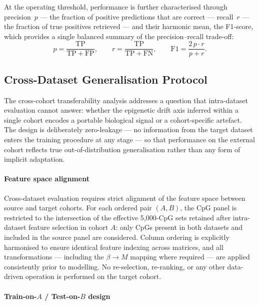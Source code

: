 \noindent At the operating threshold, performance is further characterised through
precision~$p$ — the fraction of positive predictions that are correct —
recall~$r$ — the fraction of true positives retrieved — and their harmonic
mean, the F1-score, which provides a single balanced summary of the
precision--recall trade-off:
\begin{equation}
p = \frac{\mathrm{TP}}{\mathrm{TP}+\mathrm{FP}},
\qquad
r = \frac{\mathrm{TP}}{\mathrm{TP}+\mathrm{FN}},
\qquad
\mathrm{F1} = \frac{2\,p\cdot r}{p+r}.
\end{equation}

\subsection{Cross-Dataset Generalisation Protocol}
\label{sec:cross_dataset}

The cross-cohort transferability analysis addresses a question
that intra-dataset evaluation cannot answer: whether the
epigenetic drift axis inferred within a single cohort encodes
a portable biological signal or a cohort-specific artefact.
The design is deliberately zero-leakage — no information from
the target dataset enters the training procedure at any stage
— so that performance on the external cohort reflects true
out-of-distribution generalisation rather than any form of
implicit adaptation.

\paragraph{Feature space alignment}

Cross-dataset evaluation requires strict alignment of the
feature space between source and target cohorts. For each
ordered pair $(A, B)$, the CpG panel is restricted to the
intersection of the effective 5,000-CpG sets retained after
intra-dataset feature selection in cohort $A$: only CpGs
present in both datasets and included in the source panel are
considered. Column ordering is explicitly harmonised to ensure
identical feature indexing across matrices, and all
transformations — including the $\beta \to M$ mapping where
required — are applied consistently prior to modelling. No
re-selection, re-ranking, or any other data-driven operation
is performed on the target cohort.

\paragraph{Train-on-$A$ / Test-on-$B$ design}

